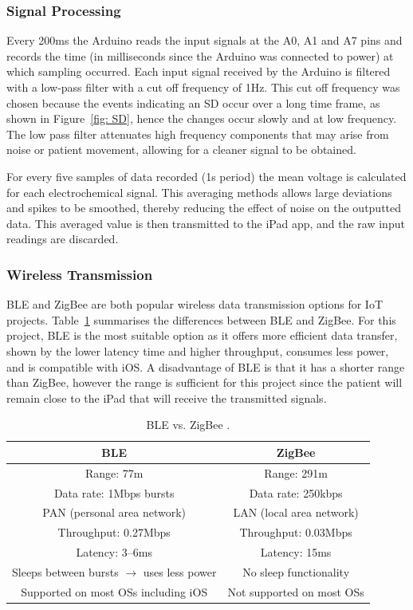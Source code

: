 \subsubsection{Signal Processing}
Every 200ms the Arduino reads the input signals at the A0, A1 and A7 pins and records the time (in milliseconds since the Arduino was connected to power) at which sampling occurred. Each input signal received by the Arduino is filtered with a low-pass filter with a cut off frequency of 1Hz. This cut off frequency was chosen because the events indicating an SD occur over a long time frame, as shown in Figure~\ref{fig: SD}, hence the changes occur slowly and at low frequency. The low pass filter attenuates high frequency components that may arise from noise or patient movement, allowing for a cleaner signal to be obtained.

For every five samples of data recorded (1s period) the mean voltage is calculated for each electrochemical signal. This averaging methods allows large deviations and spikes to be smoothed, thereby reducing the effect of noise on the outputted data. This averaged value is then transmitted to the iPad app, and the raw input readings are discarded.



\subsubsection{Wireless Transmission}
BLE and ZigBee are both popular wireless data transmission options for IoT projects. Table~\ref{table:BLE vs ZigBee} summarises the differences between BLE and ZigBee. For this project, BLE is the most suitable option as it offers more efficient data transfer, shown by the lower latency time and higher throughput, consumes less power, and is compatible with iOS. A disadvantage of BLE is that it has a shorter range than ZigBee, however the range is sufficient for this project since the patient will remain close to the iPad that will receive the transmitted signals.

\begin{table}[h!]
\centering
\begin{tabular}{||c c||} 
 \hline
 BLE & ZigBee \\ [0.5ex] 
 \hline\hline
 Range: 77m & Range: 291m \\
 Data rate: 1Mbps bursts & Data rate: 250kbps \\ 
 PAN (personal area network) & LAN (local area network) \\
 Throughput: 0.27Mbps & Throughput: 0.03Mbps \\
 Latency: 3--6ms & Latency: 15ms \\
 Sleeps between bursts $\rightarrow$ uses less power & No sleep functionality \\
 Supported on most OSs including iOS & Not supported on most OSs \\
 \hline
\end{tabular}
\caption{BLE vs. ZigBee \cite{Ray2015, Christiano}.}
\label{table:BLE vs ZigBee}
\end{table}


